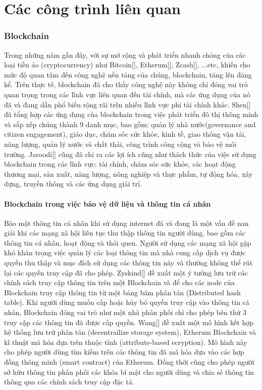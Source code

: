 \chapter{Các công trình liên quan}
\label{Chapter2}
\subsection{Blockchain}
Trong những năm gần đây, với sự mở rộng và phát triển nhanh chóng của các loại tiền ảo (cryptocurrency) như Bitcoin[], Etherum[], Zcash[], ...etc, khiến cho mức độ quan tâm đến công nghệ nền tảng của chúng, blockchain, tăng lên đáng kể. Trên thực tế, blockchain đã cho thấy công nghệ này không chỉ đóng vai trò quan trọng trong các lĩnh vực liên quan đến tài chính, mà các ứng dụng của nó đã và đang dần phổ biến rộng rãi trên nhiều lĩnh vực phi tài chính khác. Shen[] đã tổng hợp các ứng dụng của blockchain trong việc phát triển đô thị thông minh và sắp xếp chúng thành 9 danh mục, bao gồm: quản lý nhà nước(governance and citizen engagement), giáo dục, chăm sóc sức khỏe, kinh tế, giao thông vận tải, năng lượng, quản lý nước và chất thải, công trình công cộng và bảo vệ môi trường. Jaroodi[] cũng đã chỉ ra các lợi ích cũng như thách thức của việc sử dụng blockchain trong các lĩnh vực: tài chính, chăm sóc sức khỏe, các hoạt động thương mại, sản xuất, năng lượng, nông nghiệp và thực phẩm, tự động hóa, xây dựng, truyền thông và các ứng dụng giải trí. 
\subsubsection{Blockchain trong việc bảo vệ dữ liệu và thông tin cá nhân}
Bảo mật thông tin cá nhân khi sử dụng internet đã và đang là một vấn đề nan giải khi các mạng xã hội liên tục thu thập thông tin người dùng, bao gồm các thông tin cá nhân, hoạt động và thói quen. Người sử dụng các mạng xã hội gặp khó khăn trọng việc quản lý các loại thông tin mà nhà cung cấp dịch vụ được quyền thu thập và mục đích sử dụng các thông tin này và thường không thể rút lại các quyền truy cập đã cho phép. Zyskind[] đề xuất một ý tưởng lưu trữ các chính sách truy cập thông tin trên một Blockchain và để cho các node của Blockchain truy cập thông tin từ một bảng băm phân tán (Distributed hash table). Khi người dùng muốn cấp hoặc hủy bỏ quyền truy cập vào thông tin cá nhân, Blockchain đóng vai trò như một nhà phân phối chỉ cho phép bên thứ 3 truy cập các thông tin đã được cấp quyền. Wang[] đề xuất một mô hình kết hợp hệ thống lưu trữ phân tán (decentrailize storage system), Etherum Blockchain và kĩ thuật mã hóa dựa trên thuộc tính (attribute-based ecryption). Mô hình này cho phép người dùng tìm kiếm trên các thông tin đã mã hóa dựa vào các hợp đồng thông minh (smart contract) của Etherum. Đồng thời cũng cho phép người sở hữu thông tin phân phối các khóa bí mật cho người dùng và chia sẻ thông tin thông qua các chính sách truy cập đặc tả. \\
